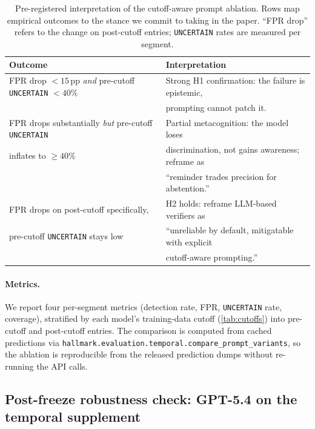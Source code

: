 \begin{table}[h]
\centering
\small
\caption{Pre-registered interpretation of the cutoff-aware prompt ablation.  Rows map empirical outcomes to the stance we commit to taking in the paper.  ``FPR drop'' refers to the change on post-cutoff entries; \texttt{UNCERTAIN} rates are measured per segment.}
\label{tab:cutoff-aware-preregistration}
\begin{tabular}{ll}
\toprule
\textbf{Outcome} & \textbf{Interpretation} \\
\midrule
FPR drop ${<}15$\,pp \emph{and} pre-cutoff \texttt{UNCERTAIN} ${<}40\%$
  & Strong H1 confirmation: the failure is epistemic, \\
  & prompting cannot patch it. \\
\addlinespace
FPR drops substantially \emph{but} pre-cutoff \texttt{UNCERTAIN}
  & Partial metacognition: the model loses \\
  \quad inflates to ${\geq}40\%$
  & discrimination, not gains awareness; reframe as \\
  & ``reminder trades precision for abstention.'' \\
\addlinespace
FPR drops on post-cutoff specifically,
  & H2 holds: reframe LLM-based verifiers as \\
  \quad pre-cutoff \texttt{UNCERTAIN} stays low
  & ``unreliable by default, mitigatable with explicit \\
  & cutoff-aware prompting.'' \\
\bottomrule
\end{tabular}
\end{table}

\paragraph{Metrics.}
We report four per-segment metrics (detection rate, FPR, \texttt{UNCERTAIN} rate, coverage), stratified by each model's training-data cutoff (\cref{tab:cutoffs}) into pre-cutoff and post-cutoff entries.
The comparison is computed from cached predictions via \texttt{hallmark.evaluation.temporal.compare\_prompt\_variants}, so the ablation is reproducible from the released prediction dumps without re-running the API calls.



\subsection*{Post-freeze robustness check: GPT-5.4 on the temporal supplement}
\label{app:gpt54-probe}

